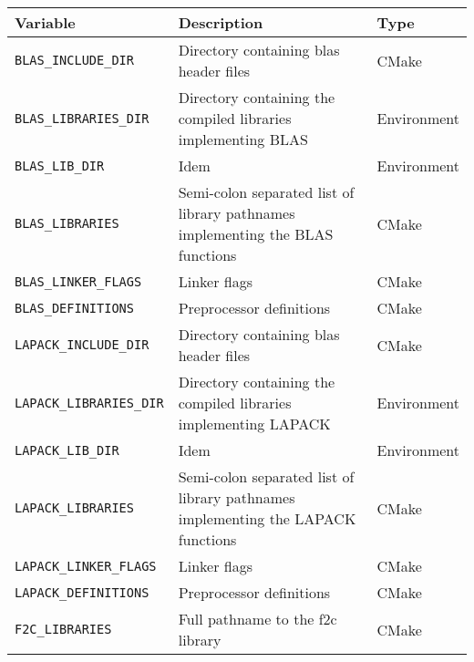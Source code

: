 {\ccTexHtml{\small}{}
\renewcommand{\arraystretch}{1.3}
\gdef\lcTabularBorder{2}
\begin{tabular}{|l|l|l|} \hline
  \textbf{Variable}               & \textbf{Description}                                                             & \textbf{Type}\\\hline\hline
  \texttt{BLAS\_INCLUDE\_DIR}     & Directory containing blas header files                                           & CMake\\\hline
  \texttt{BLAS\_LIBRARIES\_DIR}   & Directory containing the compiled libraries implementing BLAS                    & Environment\\\hline
  \texttt{BLAS\_LIB\_DIR}         & Idem                                                                             & Environment\\\hline
  \texttt{BLAS\_LIBRARIES}        & Semi-colon separated list of library pathnames implementing the BLAS functions   & CMake\\\hline
  \texttt{BLAS\_LINKER\_FLAGS}    & Linker flags                                                                     & CMake\\\hline
  \texttt{BLAS\_DEFINITIONS}      & Preprocessor definitions                                                         & CMake\\\hline
  \texttt{LAPACK\_INCLUDE\_DIR}   & Directory containing blas header files                                           & CMake\\\hline
  \texttt{LAPACK\_LIBRARIES\_DIR} & Directory containing the compiled libraries implementing LAPACK                  & Environment\\\hline
  \texttt{LAPACK\_LIB\_DIR}       & Idem                                                                             & Environment\\\hline
  \texttt{LAPACK\_LIBRARIES}      & Semi-colon separated list of library pathnames implementing the LAPACK functions & CMake\\\hline
  \texttt{LAPACK\_LINKER\_FLAGS}  & Linker flags                                                                     & CMake\\\hline
  \texttt{LAPACK\_DEFINITIONS}    & Preprocessor definitions                                                         & CMake\\\hline
  \texttt{F2C\_LIBRARIES}         & Full pathname to the f2c library                                                 & CMake\\\hline
\end{tabular}
}

